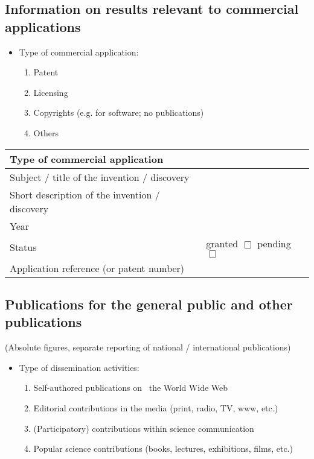 \documentclass[a4paper, 11pt]{article}
\begin{document}
\subsection{Information on results relevant to commercial applications}

\begin{itemize}
\item Type of commercial application:
  \begin{enumerate}
    \item Patent
    \item Licensing
    \item Copyrights (e.g. for software; no publications)
    \item Others
  \end{enumerate}
\end{itemize}

\begin{tabular}{|l|l|}
\hline
Type of commercial application & \\
\hline
Subject / title of the invention / discovery & \\
\hline
Short description of the invention / discovery & \\
\hline
Year & \\
\hline
Status & granted $\Box$ \hspace{2cm} pending $\Box$ \\
\hline
Application reference (or patent number) & \\
\hline
\end{tabular}

\subsection{Publications for the general public and other publications}

(Absolute figures, separate reporting of national / international publications)

\begin{itemize}
  \item Type of dissemination activities:
  \begin{enumerate}
    \item Self-authored publications on  the World Wide Web
    \item Editorial contributions in the media (print, radio, TV, www, etc.)
    \item (Participatory) contributions within science communication
    \item Popular science contributions (books, lectures, exhibitions, films, etc.)
  \end{enumerate}
\end{itemize}
\end{document}
